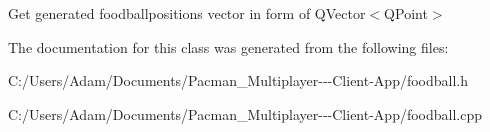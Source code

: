 Get generated foodballpositions vector in form of Q\+Vector$<$\+Q\+Point$>$ 

The documentation for this class was generated from the following files\+:\begin{DoxyCompactItemize}
\item 
C\+:/\+Users/\+Adam/\+Documents/\+Pacman\+\_\+\+Multiplayer-\/-\/-\/\+Client-\/\+App/foodball.\+h\item 
C\+:/\+Users/\+Adam/\+Documents/\+Pacman\+\_\+\+Multiplayer-\/-\/-\/\+Client-\/\+App/foodball.\+cpp\end{DoxyCompactItemize}
